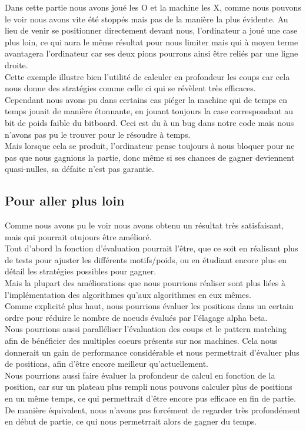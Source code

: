 \documentclass{article}
\begin{document}
Dans cette partie nous avons joué les O et la machine les X, comme nous pouvons le voir nous avons vite été stoppés mais pas
de la manière la plus évidente.
Au lieu de venir se positionner directement devant nous, l'ordinateur a joué une case plus loin, ce qui aura le même résultat 
pour nous limiter mais qui à moyen terme avantagera l'ordinateur car ses deux pions pourrons ainsi être reliés par une ligne droite.\\
Cette exemple illustre bien l'utilité de calculer en profondeur les coups car cela nous donne des stratégies comme celle ci qui se révèlent
très efficaces.\\

Cependant nous avons pu dans certains cas piéger la machine qui de temps en temps jouait de manière étonnante, en jouant toujours la case
correspondant au bit de poids faible du bitboard. Ceci est du à un bug dans notre code mais nous n'avons pas pu le trouver pour le résoudre à temps.\\
Mais lorsque cela se produit, l'ordinateur pense toujours à nous bloquer pour ne pas que nous gagnions la partie, donc même si ses chances de gagner
deviennent quasi-nulles, sa défaite n'est pas garantie.\\

\pagebreak
\subsection{Pour aller plus loin}

Comme nous avons pu le voir nous avons obtenu un résultat très satisfaisant, mais qui pourrait otujours être amélioré.\\
Tout d'abord la fonction d'évaluation pourrait l'être, que ce soit en réalisant plus de tests pour ajuster les différents motifs/poids,
ou en étudiant encore plus en détail les stratégies possibles pour gagner.\\

Mais la plupart des améliorations que nous pourrions réaliser sont plus liées à l'implémentation des algorithmes qu'aux algorithmes en eux mêmes.\\
Comme explicité plus haut, nous pourrions évaluer les positions dans un certain ordre pour réduire le nombre de noeuds évalués par l'élagage alpha
beta.\\
Nous pourrions aussi paralléliser l'évaluation des coups et le pattern matching afin de bénéficier des multiples coeurs présents sur nos machines.
Cela nous donnerait un gain de performance considérable et nous permettrait d'évaluer plus de positions, afin d'être encore meilleur qu'actuellement.\\
Nous pourrions aussi faire évaluer la profondeur de calcul en fonction de la position, car sur un plateau plus rempli nous pouvons calculer plus de
positions en un même temps, ce qui permettrait d'être encore pus efficace en fin de partie. De manière équivalent, nous n'avons pas forcément de regarder
très profondément en début de partie, ce qui nous permetrrait alors de gagner du temps.\\
\end{document}
